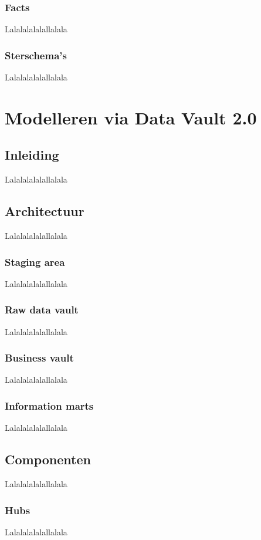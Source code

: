 \subsubsection{Facts}
Lalalalalalallalala

\subsubsection{Sterschema's}
Lalalalalalallalala

\section{Modelleren via Data Vault 2.0}

\subsection{Inleiding}
Lalalalalalallalala

\subsection{Architectuur}
Lalalalalalallalala

\subsubsection{Staging area}
Lalalalalalallalala

\subsubsection{Raw data vault}
Lalalalalalallalala

\subsubsection{Business vault}
Lalalalalalallalala

\subsubsection{Information marts}
Lalalalalalallalala

\subsection{Componenten}
Lalalalalalallalala

\subsubsection{Hubs}
Lalalalalalallalala

